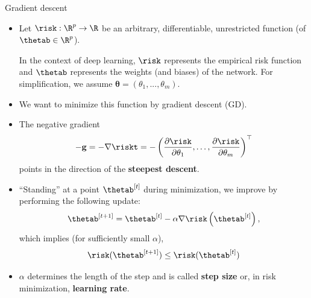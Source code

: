 \begin{vbframe}{Gradient descent}
  \begin{itemize}
    \item Let $\risk: \R^p \to \R$ be an arbitrary, differentiable, unrestricted function (of $\thetab \in \R^p$). \\
    \begin{footnotesize}
    In the context of deep learning, $\risk$ represents the empirical risk function and $\thetab$ represents the weights (and biases) of the network. For simplification, we assume $\bm{\theta} = (\theta_1, ..., \theta_m)$. 
    \end{footnotesize}
    \item We want to minimize this function by gradient descent (GD). 
    \item The negative gradient 
    $$
    - \mathbf{g} = - \nabla \riskt = - \left(\frac{\partial \risk}{\partial \theta_1}, \ldots, \frac{\partial \risk}{\partial \theta_m}\right)^\top
    $$ 
    points in the direction of the \textbf{steepest descent}.
  \end{itemize}

    \framebreak

  \begin{itemize}
    \item \enquote{Standing} at a point $\thetab^{[t]}$ during minimization, we improve by performing the following update: 
    $$
      \thetab^{[t + 1 ]}  = \thetab^{[t]} - \alpha \nabla \risk\left(\thetab^{[t]}\right),
    $$
    which implies (for sufficiently small $\alpha$),
    $$
    \risk(\bm{\thetab}^{[t+1]}) \leq \risk(\bm{\thetab}^{[t]})
    $$
    \item $\alpha$ determines the length of the step and is called \textbf{step size} or, in risk minimization, \textbf{learning rate}.
  \end{itemize}

\end{vbframe} 

